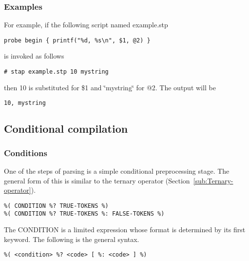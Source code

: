 \documentclass[twoside,english]{article}
\newenvironment{vindent}
{\begin{list}{}{\setlength{\listparindent}{6pt}}
\item[]}
{\end{list}}
\begin{document}
\subsubsection{Examples}

For example, if the following script named example.stp

\begin{vindent}
\begin{verbatim}
probe begin { printf("%d, %s\n", $1, @2) }
\end{verbatim}
\end{vindent}
is invoked as follows

\begin{vindent}
\begin{verbatim}
# stap example.stp 10 mystring
\end{verbatim}
\end{vindent}
then 10 is substituted for \$1 and \char`\"{}mystring\char`\"{} for @2. The
output will be

\begin{vindent}
\begin{verbatim}
10, mystring
\end{verbatim}
\end{vindent}

\subsection{Conditional compilation}


\subsubsection{Conditions}
One of the steps of parsing is a simple conditional preprocessing stage.
The general form of this is similar to the ternary operator (Section~\ref{sub:Ternary-operator}).

\begin{vindent}
\begin{verbatim}
%( CONDITION %? TRUE-TOKENS %)
%( CONDITION %? TRUE-TOKENS %: FALSE-TOKENS %)
\end{verbatim}
\end{vindent}
The CONDITION is a limited expression whose format is determined by its first
keyword. The following is the general syntax.

\begin{vindent}
\begin{verbatim}
%( <condition> %? <code> [ %: <code> ] %)
\end{verbatim}
\end{vindent}
\end{document}
